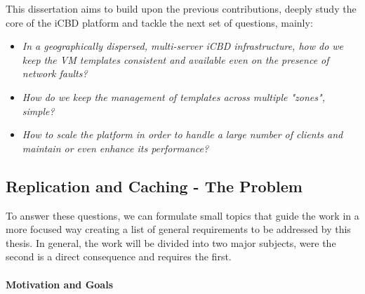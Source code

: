 This dissertation aims to build upon the previous contributions, deeply study the core of the iCBD platform and tackle the next set of questions, mainly:

\begin{itemize}
	\item \textit{In a geographically dispersed, multi-server iCBD infrastructure, how do we keep the VM templates consistent and available even on the presence of network faults?}
	\item \textit{How do we keep the management of templates across multiple "zones", simple?}
	\item \textit{How to scale the platform in order to handle a large number of clients and maintain or even enhance its performance?}
\end{itemize}




\subsection{Replication and Caching - The Problem}
\label{sec:intro_replication_cache_theproblem}

To answer these questions, we can formulate small topics that guide the work in a more focused way creating a list of general requirements to be addressed by this thesis.
In general, the work will be divided into two major subjects, were the second is a direct consequence and requires the first.


\paragraph{Motivation and Goals}
\label{par:intro_motivation_goals}

